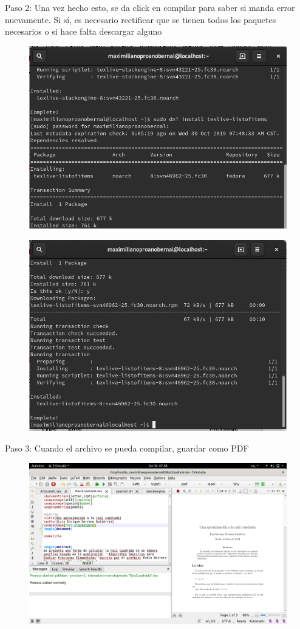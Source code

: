 \documentclass[]{article}
\begin{document}
Paso 2: Una vez hecho esto, se da click en compilar para saber si manda error nuevamente. Si sí, es necesario rectificar que se tienen todos los paquetes necesarios o si hace falta descargar alguno
\begin{figure}[H]
	\centering
	\includegraphics[width=0.5\linewidth]{"Imagenes/Captura 3 Raiz"}
	\caption{}
	\label{fig:captura-3-raiz}
\end{figure}
\begin{figure}[H]
	\centering
	\includegraphics[width=0.5\linewidth]{"Imagenes/Captura 4 Raiz"}
	\caption{}
	\label{fig:captura-4-raiz}
\end{figure}

Paso 3: Cuando el archivo se pueda compilar, guardar como PDF
\begin{figure}[H]
	\centering
	\includegraphics[width=0.5\linewidth]{"Imagenes/Captura 5 Raiz"}
	\caption{}
	\label{fig:captura-5-raiz}
\end{figure}

\section{}
\end{document}
